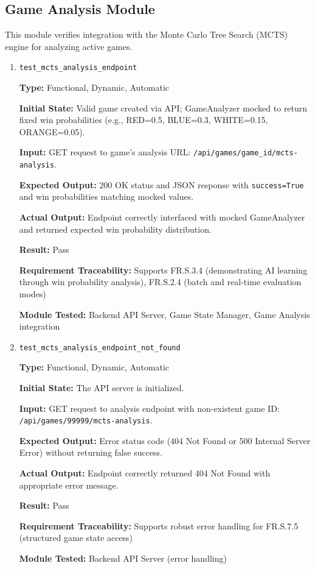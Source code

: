 \documentclass[12pt, titlepage]{article}
\begin{document}
\subsection{Game Analysis Module}

This module verifies integration with the Monte Carlo Tree Search (MCTS) engine for analyzing active games.

\begin{enumerate}

\item \texttt{test\_mcts\_analysis\_endpoint}

\textbf{Type:} Functional, Dynamic, Automatic

\textbf{Initial State:} Valid game created via API; GameAnalyzer mocked to return fixed win probabilities (e.g., RED=0.5, BLUE=0.3, WHITE=0.15, ORANGE=0.05).

\textbf{Input:} GET request to game's analysis URL: \texttt{/api/games/{game\_id}/mcts-analysis}.

\textbf{Expected Output:} 200 OK status and JSON response with \texttt{success=True} and win probabilities matching mocked values.

\textbf{Actual Output:} Endpoint correctly interfaced with mocked GameAnalyzer and returned expected win probability distribution.

\textbf{Result:} Pass

\textbf{Requirement Traceability:} Supports FR.S.3.4 (demonstrating AI learning through win probability analysis), FR.S.2.4 (batch and real-time evaluation modes)

\textbf{Module Tested:} Backend API Server, Game State Manager, Game Analysis integration


\item \texttt{test\_mcts\_analysis\_endpoint\_not\_found}

\textbf{Type:} Functional, Dynamic, Automatic

\textbf{Initial State:} The API server is initialized.

\textbf{Input:} GET request to analysis endpoint with non-existent game ID: \texttt{/api/games/99999/mcts-analysis}.

\textbf{Expected Output:} Error status code (404 Not Found or 500 Internal Server Error) without returning false success.

\textbf{Actual Output:} Endpoint correctly returned 404 Not Found with appropriate error message.

\textbf{Result:} Pass

\textbf{Requirement Traceability:} Supports robust error handling for FR.S.7.5 (structured game state access)

\textbf{Module Tested:} Backend API Server (error handling)

\end{enumerate}
\end{document}
